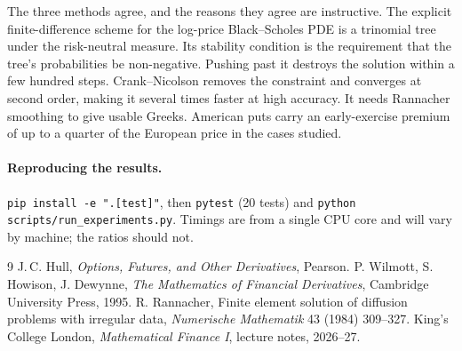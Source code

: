 \documentclass[11pt,a4paper]{article}
\begin{document}
The three methods agree, and the reasons they agree are instructive. The explicit
finite-difference scheme for the log-price Black--Scholes PDE is a trinomial tree under the
risk-neutral measure. Its stability condition is the requirement that the tree's probabilities be
non-negative. Pushing past it destroys the solution within a few hundred steps. Crank--Nicolson
removes the constraint and converges at second order, making it several times faster at high
accuracy. It needs Rannacher smoothing to give usable Greeks. American puts carry an
early-exercise premium of up to a quarter of the European price in the cases studied.

\paragraph{Reproducing the results.} \texttt{pip install -e ".[test]"}, then \texttt{pytest}
(20 tests) and \texttt{python scripts/run\_experiments.py}. Timings are from a single CPU core
and will vary by machine; the ratios should not.

\begin{thebibliography}{9}\small
{} J.\,C. Hull, \emph{Options, Futures, and Other Derivatives}, Pearson.
 P. Wilmott, S. Howison, J. Dewynne, \emph{The Mathematics of Financial Derivatives},
Cambridge University Press, 1995.
 R. Rannacher, Finite element solution of diffusion problems with irregular data,
\emph{Numerische Mathematik} 43 (1984) 309--327.
 King's College London, \emph{Mathematical Finance I}, lecture notes, 2026--27.
\end{thebibliography}
\end{document}
